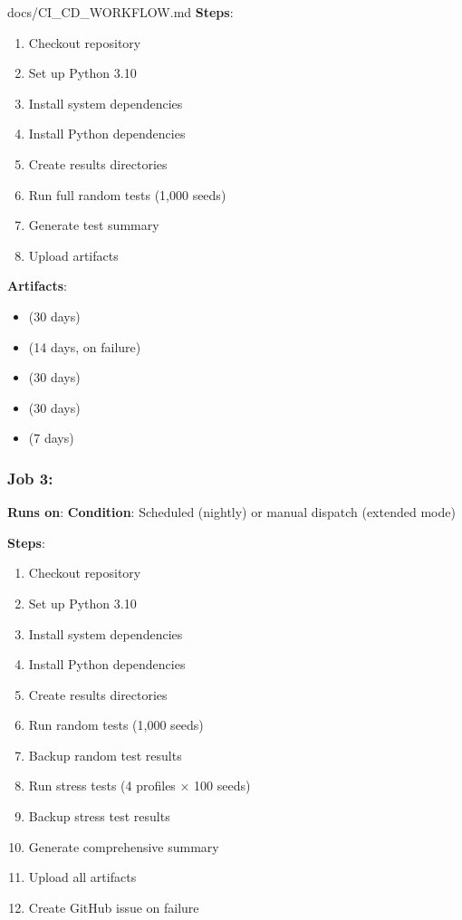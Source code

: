 \begin{relocated}{docs/CI_CD_WORKFLOW.md}
\textbf{Steps}:

\begin{enumerate}
\def\labelenumi{\arabic{enumi}.}
\tightlist
\item
  Checkout repository
\item
  Set up Python 3.10
\item
  Install system dependencies
\item
  Install Python dependencies
\item
  Create results directories
\item
  Run full random tests (1,000 seeds)
\item
  Generate test summary
\item
  Upload artifacts
\end{enumerate}

\textbf{Artifacts}:

\begin{itemize}
\tightlist
\item
   (30 days)
\item
   (14 days, on failure)
\item
   (30 days)
\item
   (30 days)
\item
   (7 days)
\end{itemize}

\subsubsection{\texorpdfstring{Job 3: }{Job 3: }}\label{um:flow:ci-cd-workflow:job-3-extended-test}

\textbf{Runs on}:  \textbf{Condition}: Scheduled
(nightly) or manual dispatch (extended mode)

\textbf{Steps}:

\begin{enumerate}
\def\labelenumi{\arabic{enumi}.}
\tightlist
\item
  Checkout repository
\item
  Set up Python 3.10
\item
  Install system dependencies
\item
  Install Python dependencies
\item
  Create results directories
\item
  Run random tests (1,000 seeds)
\item
  Backup random test results
\item
  Run stress tests (4 profiles × 100 seeds)
\item
  Backup stress test results
\item
  Generate comprehensive summary
\item
  Upload all artifacts
\item
  Create GitHub issue on failure
\end{enumerate}


\end{relocated}
